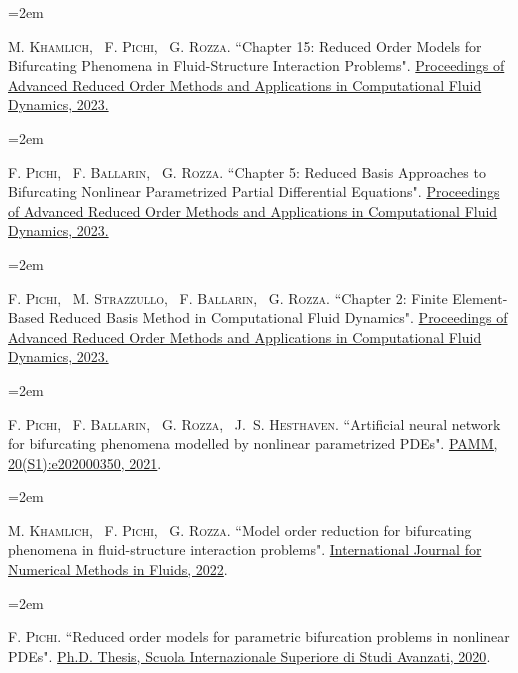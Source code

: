\documentclass{scrartcl}
\newcommand{\MarginText}[1]{\marginpar{\raggedleft\itshape\small#1}} %
\newlength{\datebox}\settowidth{\datebox}{Spring 2011} %
\newcommand{\NewEntry}[3]{\noindent\hangindent=2em\hangafter=0 \parbox{\datebox}{\small \textit{#1}}\hspace{1.5em} #2 #3 %
\vspace{0.5em}} %
\newcommand{\Description}[1]{\hangindent=2em\hangafter=0\noindent\raggedright\footnotesize{#1}\par\normalsize\vspace{1em}} %
\begin{document}
\begin{cv}{}
\Description{\MarginText{[11]}M. \textsc{Khamlich}, ~F. \textsc{Pichi}, ~G. \textsc{Rozza.} {\color{blue} ``Chapter 15: Reduced Order Models for Bifurcating Phenomena in Fluid-Structure Interaction Problems".} \href{https://epubs.siam.org/doi/10.1137/1.9781611977257.ch15}{Proceedings of Advanced Reduced Order Methods and Applications in Computational Fluid Dynamics, 2023.}}

\newpage
\Description{\MarginText{[10]}F. \textsc{Pichi}, ~F. \textsc{Ballarin}, ~G. \textsc{Rozza.} {\color{blue} ``Chapter 5: Reduced Basis Approaches to Bifurcating Nonlinear Parametrized Partial Differential Equations".} \href{https://epubs.siam.org/doi/10.1137/1.9781611977257.ch5}{Proceedings of Advanced Reduced Order Methods and Applications in Computational Fluid Dynamics, 2023.}}


\Description{\MarginText{[9]}F. \textsc{Pichi}, ~M. \textsc{Strazzullo}, ~F. \textsc{Ballarin}, ~G. \textsc{Rozza.} {\color{blue} ``Chapter 2: Finite Element-Based Reduced Basis Method in Computational Fluid Dynamics".} \href{https://epubs.siam.org/doi/10.1137/1.9781611977257.ch2}{Proceedings of Advanced Reduced Order Methods and Applications in Computational Fluid Dynamics, 2023.}}


\Description{\MarginText{[8]}F. \textsc{Pichi}, ~F. \textsc{Ballarin}, ~G. \textsc{Rozza}, ~J.~S. \textsc{Hesthaven.} {\color{blue} ``Artificial neural network for bifurcating phenomena modelled by nonlinear parametrized PDEs".} \href{https://onlinelibrary.wiley.com/doi/abs/10.1002/pamm.202000350}{PAMM, 20(S1):e202000350, 2021}.}

\Description{\MarginText{[7]}M. \textsc{Khamlich}, ~F. \textsc{Pichi}, ~G. \textsc{Rozza.} {\color{blue} ``Model order reduction for bifurcating phenomena in fluid-structure interaction problems".} \href{https://onlinelibrary.wiley.com/doi/abs/10.1002/fld.5118}{International Journal for Numerical Methods in Fluids, 2022}.}




\Description{\MarginText{[6]}F. \textsc{Pichi.} {\color{blue} ``Reduced order models for parametric bifurcation
problems in nonlinear {PDE}s".} \href{https://iris.sissa.it/handle/20.500.11767/114329}{Ph.D. Thesis, Scuola Internazionale Superiore di Studi Avanzati, 2020}.}



\end{cv}
\end{document}
